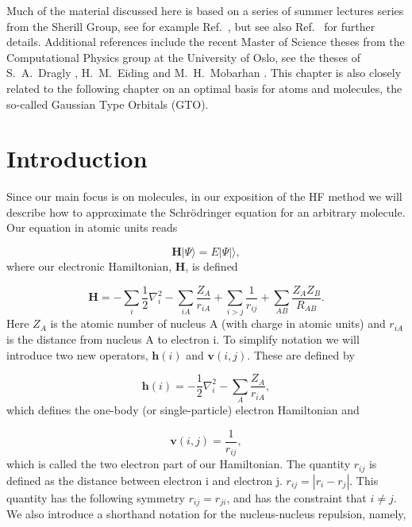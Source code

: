 \documentclass[a4paper,norsk,11pt,twoside]{report}
\begin{document}
Much of the material discussed here is based on a series of summer lectures
series from the Sherill Group, see for example Ref.~\cite{ref111111}, but see also 
Ref.~\cite{ref222222} for further details. Additional references include the recent Master of Science theses from the 
Computational Physics group at the University of Oslo, see the theses of
S.~A.~Dragly \cite{sadragly}, H.~M.~Eiding \cite{hmeiding} and M.~H.~Mobarhan \cite{mhmobarhan}. 
This chapter is also closely
related to the following chapter on an optimal basis for atoms and molecules, the so-called  Gaussian Type Orbitals (GTO).

\section{Introduction}
Since our main focus is on molecules, in our exposition of  
the HF method we will describe how to approximate the Schr\"odringer equation for an arbitrary molecule. 
Our equation in atomic units reads	

\begin{equation}
\textbf{H} | \Psi \rangle = E | \Psi |\rangle,
\label{hartreefock_1}
\end{equation}
where our electronic Hamiltonian, $\textbf{H}$, is defined

\begin{equation}
\textbf{H} = 
- \sum_i \frac{1}{2} \nabla_i^2 
- \sum_{iA} \frac{Z_A}{r_{iA}}
+ \sum_{i>j} \frac{1}{r_{ij}} 
+ \sum_{AB} \frac{Z_A Z_B}{R_{AB}} .
\end{equation}
Here $Z_A$ is the atomic number of nucleus A (with charge in atomic units) 
and $r_{iA}$ is the distance from nucleus A to electron i. 
To simplify notation we will introduce two new operators, $\textbf{h}(i)$ and $\textbf{v}(i,j)$. These are defined by

\begin{equation}
\textbf{h}(i) = - \frac{1}{2} \nabla_i^2 - \sum_A \frac{Z_A}{r_{iA}}, \label{single_particle_hf}
\end{equation}
which defines the one-body (or single-particle) electron Hamiltonian and

\begin{equation}
\textbf{v}(i,j) = \frac{1}{r_{ij}},
\end{equation}
which is called the two electron part of our Hamiltonian. The quantity
$r_{ij}$ is defined as the distance between electron i and electron
j. $r_{ij} = |r_i - r_j|$. This quantity has the following symmetry
$r_{ij} = r_{ji}$, and has the constraint that $i \not= j$. We also
introduce a shorthand notation for the nucleus-nucleus repulsion, namely,
\end{document}
